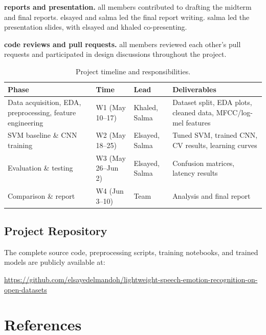 \documentclass[conference]{IEEEtran}
\begin{document}
{\textbf{reports and presentation.} all members contributed to drafting
the midterm and final reports. elsayed and salma led the final report
writing. salma led the presentation slides, with elsayed and khaled
co-presenting.

\textbf{code reviews and pull requests.} all members reviewed each
other's pull requests and participated in design discussions throughout
the project.

\begin{table}[t]
\caption{Project timeline and responsibilities.}
\label{tab:timeline}
\centering
\footnotesize
\setlength{\tabcolsep}{2pt}

\begin{tabular}{p{2.0cm} p{2.2cm} p{1.8cm} p{2.2cm}}
\toprule
\textbf{Phase} &
\textbf{Time} &
\textbf{Lead} &
\textbf{Deliverables} \\
\midrule

Data acquisition, EDA, preprocessing,
feature engineering
& W1 (May 10--17)
& Khaled, Salma
& Dataset split, EDA plots, cleaned data,
MFCC/log-mel features \\

SVM baseline \& CNN training
& W2 (May 18--25)
& Elsayed, Salma
& Tuned SVM, trained CNN, CV results,
learning curves \\

Evaluation \& testing
& W3 (May 26--Jun 2)
& Elsayed, Salma
& Confusion matrices, latency results \\

Comparison \& report
& W4 (Jun 3--10)
& Team
& Analysis and final report \\

\bottomrule
\end{tabular}
\end{table}

\subsection*{Project Repository}

The complete source code, preprocessing scripts, training notebooks, and trained models are publicly available at:

\url{https://github.com/elsayedelmandoh/lightweight-speech-emotion-recognition-on-open-datasets}


\section*{References}\label{references}

}
\end{document}
